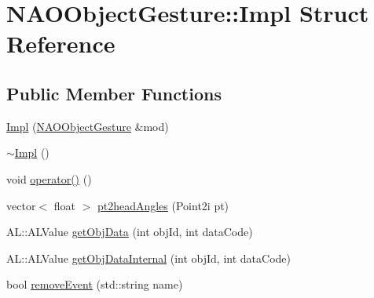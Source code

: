 \hypertarget{structNAOObjectGesture_1_1Impl}{\section{\-N\-A\-O\-Object\-Gesture\-:\-:\-Impl \-Struct \-Reference}
\label{structNAOObjectGesture_1_1Impl}
}
\subsection*{\-Public \-Member \-Functions}
\begin{DoxyCompactItemize}
\item 
\hyperlink{structNAOObjectGesture_1_1Impl_a5588de34f412446840dc3989e08df4f4}{\-Impl} (\hyperlink{classNAOObjectGesture}{\-N\-A\-O\-Object\-Gesture} \&mod)
\item 
\hyperlink{structNAOObjectGesture_1_1Impl_ab7e3ee127654a0c951b90ce634948512}{$\sim$\-Impl} ()
\item 
void \hyperlink{structNAOObjectGesture_1_1Impl_ab7475aecd231f0211210d9547b62de3d}{operator()} ()
\item 
vector$<$ float $>$ \hyperlink{structNAOObjectGesture_1_1Impl_a052269733ff0201cbe8c15406dca10af}{pt2head\-Angles} (\-Point2i pt)
\item 
\-A\-L\-::\-A\-L\-Value \hyperlink{structNAOObjectGesture_1_1Impl_a87a9b9560e7df2aa0185adb8c8c45e4a}{get\-Obj\-Data} (int obj\-Id, int data\-Code)
\item 
\-A\-L\-::\-A\-L\-Value \hyperlink{structNAOObjectGesture_1_1Impl_a1bb4ff91c183a0af801bede29f2e862d}{get\-Obj\-Data\-Internal} (int obj\-Id, int data\-Code)
\item 
bool \hyperlink{structNAOObjectGesture_1_1Impl_adf3de3c608d85c8ab4b787743c7afefd}{remove\-Event} (std\-::string name)
\end{DoxyCompactItemize}

